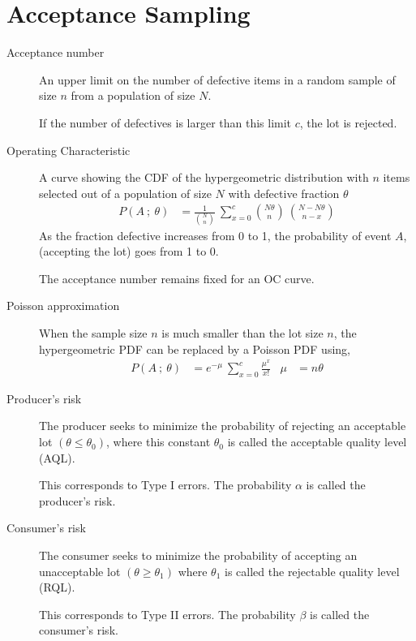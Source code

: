 \section{Acceptance Sampling}

\begin{description}
    \item[Acceptance number] An upper limit on the number of defective items in a
          random sample of size $ n $ from a population of size $ N $. \par
          If the number of defectives is larger than this limit $ c $, the lot is
          rejected.

    \item[Operating Characteristic] A curve showing the CDF of the hypergeometric
          distribution with $ n $ items selected out of a population of size $ N $ with
          defective fraction $ \theta $
          \begin{align}
              P(A\ ;\ \theta) & = \frac{1}{\binom{N}{n}}
              \ \sum_{x=0}^{c} \binom{N\theta}{n}
              \ \binom{N - N\theta}{n-x}
          \end{align}
          As the fraction defective increases from 0 to 1, the probability of event
          $ A $, (accepting the lot) goes from 1 to 0. \par
          The acceptance number remains fixed for an OC curve.

    \item[Poisson approximation] When the sample size $ n $ is much smaller than the lot
          size $ n $, the hypergeometric PDF can be replaced by a Poisson PDF using,
          \begin{align}
              P(A\ ;\ \theta) & = e^{-\mu}\ \sum_{x=0}^{c} \frac{\mu^x}{x!} &
              \mu             & = n\theta
          \end{align}

    \item[Producer's risk] The producer seeks to minimize the probability of rejecting an
          acceptable lot $ (\theta \leq \theta_0) $, where this constant $ \theta_0 $ is
          called the acceptable quality level (AQL). \par
          This corresponds to Type I errors. The probability $ \alpha $ is called
          the producer's risk.

    \item[Consumer's risk] The consumer seeks to minimize the probability of accepting
          an unacceptable lot $ (\theta \geq \theta_1) $ where $ \theta_1 $ is called the
          rejectable quality level (RQL). \par
          This corresponds to Type II errors. The probability $ \beta $ is called
          the consumer's risk.



\end{description}
